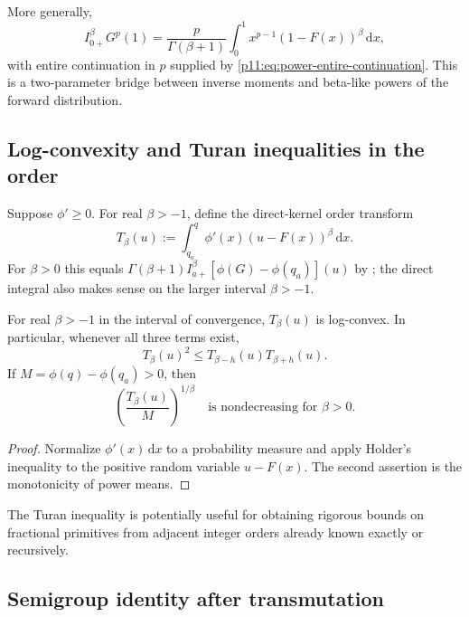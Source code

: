 \documentclass[11pt,oneside]{article}
\theoremstyle{definition}
\theoremstyle{remark}
\newcommand{\dd}{\,\mathrm d}
\newcommand{\1}{\mathbf 1}
\begin{document}
More generally,
\begin{equation}
 I_{0+}^{\beta}G^p(1)
 =\frac{p}{\Gamma(\beta+1)}
  \int_0^1x^{p-1}(1-F(x))^\beta\dd x,
 \label{p11:eq:definite-power-general}
\end{equation}
with entire continuation in $p$ supplied by
\eqref{p11:eq:power-entire-continuation}.  This is a two-parameter bridge between
inverse moments and beta-like powers of the forward distribution.

\subsection{Log-convexity and Turan inequalities in the order}

Suppose $\phi'\ge0$.  For real $\beta>-1$, define the direct-kernel
order transform
\begin{equation}
 T_\beta(u)
 :=\int_{q_a}^{q}\phi'(x)(u-F(x))^\beta\dd x.
 \label{p11:eq:T-beta-def}
\end{equation}
For $\beta>0$ this equals
$\Gamma(\beta+1)I_{a+}^{\beta}[\phi(G)-\phi(q_a)](u)$ by
; the direct integral also makes sense on
the larger interval $\beta>-1$.

\begin{proposition}
For real $\beta>-1$ in the interval of convergence, $T_\beta(u)$ is
log-convex.  In particular, whenever all three terms exist,
\begin{equation}
 T_\beta(u)^2\le T_{\beta-h}(u)T_{\beta+h}(u).
 \label{p11:eq:Turan-order}
\end{equation}
If $M=\phi(q)-\phi(q_a)>0$, then
\begin{equation}
 \left(\frac{T_\beta(u)}{M}\right)^{1/\beta}
 \quad\text{is nondecreasing for }\beta>0.
 \label{p11:eq:power-mean-order}
\end{equation}
\end{proposition}

\begin{proof}
Normalize $\phi'(x)\dd x$ to a probability measure and apply Holder's
inequality to the positive random variable $u-F(x)$.  The second assertion
is the monotonicity of power means.
\end{proof}

The Turan inequality is potentially useful for obtaining rigorous bounds on
fractional primitives from adjacent integer orders already known exactly or
recursively.

\subsection{Semigroup identity after transmutation}
\end{document}
